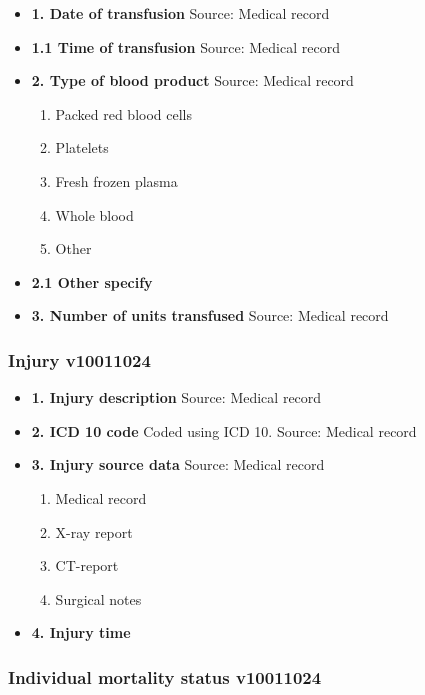 \documentclass[
]{scrartcl}
\providecommand{\tightlist}{%
  \setlength{\itemsep}{0pt}\setlength{\parskip}{0pt}}\usepackage{longtable,booktabs,array}
\begin{document}
\begin{itemize}
\item
  \textbf{1. Date of transfusion} Source: Medical record
\item
  \textbf{1.1 Time of transfusion} Source: Medical record
\item
  \textbf{2. Type of blood product} Source: Medical record

  \begin{enumerate}
  \def\labelenumi{\arabic{enumi}.}
  \tightlist
  \item
    Packed red blood cells
  \item
    Platelets
  \item
    Fresh frozen plasma
  \item
    Whole blood
  \item
    Other
  \end{enumerate}
\item
  \textbf{2.1 Other specify}
\item
  \textbf{3. Number of units transfused} Source: Medical record
\end{itemize}

\hypertarget{injury-v10011024}{%
\subsubsection{Injury v10011024}\label{injury-v10011024}}

\begin{itemize}
\item
  \textbf{1. Injury description} Source: Medical record
\item
  \textbf{2. ICD 10 code} Coded using ICD 10. Source: Medical record
\item
  \textbf{3. Injury source data} Source: Medical record

  \begin{enumerate}
  \def\labelenumi{\arabic{enumi}.}
  \tightlist
  \item
    Medical record
  \item
    X-ray report
  \item
    CT-report
  \item
    Surgical notes
  \end{enumerate}
\item
  \textbf{4. Injury time}
\end{itemize}

\hypertarget{individual-mortality-status-v10011024}{%
\subsubsection{Individual mortality status
v10011024}\label{individual-mortality-status-v10011024}}
\end{document}
